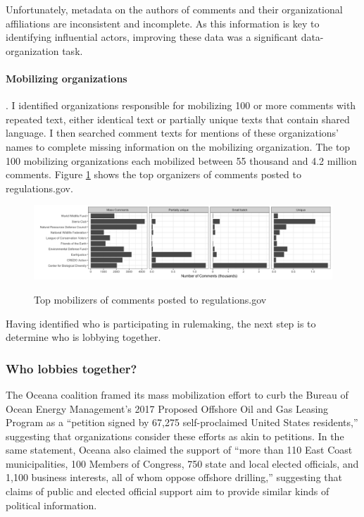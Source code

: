 Unfortunately, metadata on the authors of comments and their organizational affiliations are inconsistent and incomplete. As this information is key to identifying influential actors, improving these data was a significant data-organization task. 


\paragraph{Mobilizing organizations}. I identified organizations responsible for mobilizing 100 or more comments with repeated text, either identical text or partially unique texts that contain shared language. 
I then searched comment texts for mentions of these organizations' names to complete missing information on the mobilizing organization.
 The top 100 mobilizing organizations each mobilized between 55 thousand and 4.2 million comments. Figure \ref{fig:toporgs} shows the top organizers of comments posted to regulations.gov.

\begin{figure}[h!]
    \centering
        \caption{Top mobilizers of comments posted to regulations.gov}
    \includegraphics[width = 6.5in]{Figs/toporgs.png}
    \label{fig:toporgs}
\end{figure}

Having identified who is participating in rulemaking, the next step is to determine who is lobbying together.

\subsubsection{Who lobbies together?}
The Oceana coalition framed its mass mobilization effort to curb the  Bureau of Ocean Energy Management's 2017 Proposed Offshore Oil and Gas Leasing Program as a ``petition signed by 67,275 self-proclaimed United States residents,'' suggesting that organizations consider these efforts as akin to petitions. In the same statement, Oceana also claimed the support of ``more than 110 East Coast municipalities, 100 Members of Congress, 750 state and local elected officials, and 1,100 business interests, all of whom oppose offshore drilling,'' suggesting that claims of public and elected official support aim to provide similar kinds of political information. 


